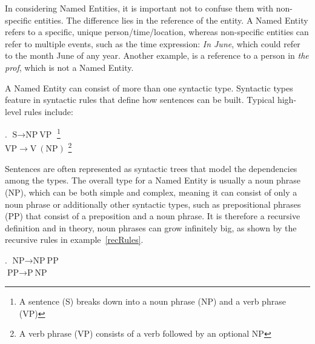 \documentclass[11pt]{article}
\newcommand{\namedentity}{Named Entity}
\begin{document}
In considering Named Entities, it is important not to confuse them with non-specific entities. %
The difference lies in the reference of the entity. A Named Entity refers to a specific, unique person/time/location, whereas
non-specific entities can refer to multiple events, such as the time expression: \emph{In June}, which could refer to the month June of any year.
Another example, is a reference to a person in \emph{the prof}, which is not a \namedentity.

A Named Entity can consist of more than one syntactic type. Syntactic types feature in syntactic rules that define how sentences can be built.
Typical high-level rules include:

\ex. $\text{S} \rightarrow \text{NP}\  \text{VP} $ \footnote{ A sentence (S) breaks down into a noun phrase (NP) and a verb phrase (VP)} \\
$ \text{VP} \rightarrow \text{V}\  (\text{NP})$ \footnote{ A verb phrase (VP) consists of a verb followed by an optional NP} 

Sentences are often represented as syntactic trees that model the dependencies among the types.
The overall type for a Named Entity is usually a noun phrase (NP), which can be both simple and complex, meaning it can consist of only a noun phrase or 
additionally other syntactic types, such as prepositional phrases (PP) that consist of a preposition and a noun phrase. 
It is therefore a recursive definition and in theory, noun phrases can grow infinitely big, as shown by the recursive rules in example~\ref{recRules}.  %

\ex. $ \text{NP} \rightarrow \text{NP} \  \text{PP}$ \\ \label{recRules}
     $ \text{PP} \rightarrow \text{P} \  \text{NP}$ 
 

% 
\end{document}

